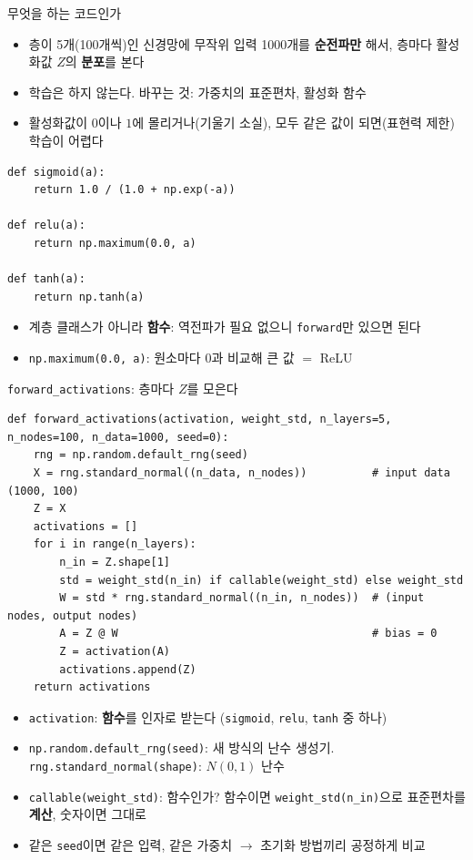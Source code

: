 \documentclass[aspectratio=169,11pt]{beamer}
\newcommand{\code}[1]{\texttt{#1}}
\begin{document}
\begin{frame}[fragile]{무엇을 하는 코드인가}
\begin{itemize}
\item 층이 5개(100개씩)인 신경망에 무작위 입력 1000개를 \textbf{순전파만} 해서, 층마다 활성화값 $Z$의 \textbf{분포}를 본다
\item 학습은 하지 않는다. 바꾸는 것: 가중치의 표준편차, 활성화 함수
\item 활성화값이 $0$이나 $1$에 몰리거나(기울기 소실), 모두 같은 값이 되면(표현력 제한) 학습이 어렵다
\end{itemize}
\begin{lstlisting}
def sigmoid(a):
    return 1.0 / (1.0 + np.exp(-a))

def relu(a):
    return np.maximum(0.0, a)

def tanh(a):
    return np.tanh(a)
\end{lstlisting}
\begin{itemize}
\item 계층 클래스가 아니라 \textbf{함수}: 역전파가 필요 없으니 \code{forward}만 있으면 된다
\item \code{np.maximum(0.0, a)}: 원소마다 $0$과 비교해 큰 값 $=$ ReLU
\end{itemize}
\end{frame}

\begin{frame}{\code{forward\_activations}: 층마다 $Z$를 모은다}
\small
\begin{lstlisting}
def forward_activations(activation, weight_std, n_layers=5, n_nodes=100, n_data=1000, seed=0):
    rng = np.random.default_rng(seed)
    X = rng.standard_normal((n_data, n_nodes))          # input data (1000, 100)
    Z = X
    activations = []
    for i in range(n_layers):
        n_in = Z.shape[1]
        std = weight_std(n_in) if callable(weight_std) else weight_std
        W = std * rng.standard_normal((n_in, n_nodes))  # (input nodes, output nodes)
        A = Z @ W                                       # bias = 0
        Z = activation(A)
        activations.append(Z)
    return activations
\end{lstlisting}
\small
\begin{itemize}
\item \code{activation}: \textbf{함수}를 인자로 받는다 (\code{sigmoid}, \code{relu}, \code{tanh} 중 하나)
\item \code{np.random.default\_rng(seed)}: 새 방식의 난수 생성기. \code{rng.standard\_normal(shape)}: $N(0,1)$ 난수
\item \code{callable(weight\_std)}: 함수인가? 함수이면 \code{weight\_std(n\_in)}으로 표준편차를 \textbf{계산}, 숫자이면 그대로
\item 같은 \code{seed}이면 같은 입력, 같은 가중치 $\to$ 초기화 방법끼리 공정하게 비교
\end{itemize}
\end{frame}
\end{document}
